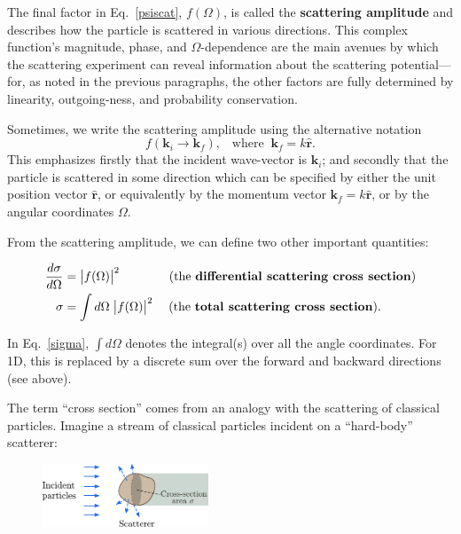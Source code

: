 \documentclass[pra,12pt]{revtex4-2}
\begin{document}
The final factor in Eq.~\eqref{psiscat}, $f(\Omega)$, is called the
\textbf{scattering amplitude} and describes how the particle is
scattered in various directions.  This complex function's magnitude,
phase, and $\Omega$-dependence are the main avenues by which the
scattering experiment can reveal information about the scattering
potential---for, as noted in the previous paragraphs, the other
factors are fully determined by linearity, outgoing-ness, and
probability conservation.

Sometimes, we write the scattering amplitude using the alternative
notation
\begin{equation}
  f(\mathbf{k}_i \rightarrow \mathbf{k}_f), \;\;\;\mathrm{where}\;\; \mathbf{k}_f = k \hat{\mathbf{r}}.
\end{equation}
This emphasizes firstly that the incident wave-vector is
$\mathbf{k}_i$; and secondly that the particle is scattered in some
direction which can be specified by either the unit position vector
$\hat{\mathbf{r}}$, or equivalently by the momentum vector
$\mathbf{k}_f = k \hat{\mathbf{r}}$, or by the angular coordinates
$\Omega$.

From the scattering amplitude, we can define two other important
quantities:
\begin{framed}
  \begin{align}
    \frac{d\sigma}{d\Omega} &= \big|f(\Omega)\big|^2 \qquad\quad\quad \text{(the \textbf{differential scattering cross section})} \\ \sigma &= \int d\Omega\; \big|f(\Omega)\big|^2 \quad\; \text{(the \textbf{total scattering cross section}).} \label{sigma}
  \end{align}
\end{framed}
\vskip -0.1in
\noindent
In Eq.~\eqref{sigma}, $\int d\Omega$ denotes the integral(s) over all
the angle coordinates.  For 1D, this is replaced by a discrete sum
over the forward and backward directions (see above).

The term ``cross section'' comes from an analogy with the scattering
of classical particles.  Imagine a stream of classical particles
incident on a ``hard-body'' scatterer:

\begin{figure}[h]
  \centering\includegraphics[width=0.44\textwidth]{crosssection}
\end{figure}
\end{document}
